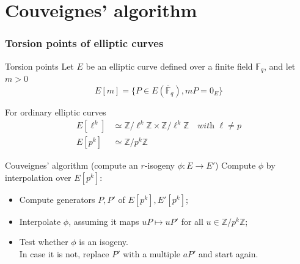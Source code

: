 \documentclass[10pt]{beamer}
\theoremstyle{plain}
\theoremstyle{definition}
\theoremstyle{definition}
\theoremstyle{definition}
\theoremstyle{definition}
\theoremstyle{remark}
\theoremstyle{remark}
\newcommand{\orangebox}[2]{\begin{block}{#1}#2\end{block}}
\renewcommand{\emph}[1]{{\usebeamercolor[fg]{structure}#1}}
\def\F{\mathbb{F}}
\begin{document}

\section{Couveignes' algorithm}

\begin{frame}
  \frametitle{Torsion points of elliptic curves}

  \vspace{-1mm}

  \orangebox{Torsion points}{
    Let $E$ be an elliptic curve defined over a finite field $\F_q$, and let $m>0$
    \vspace{-1.5mm}
    \[E[m]= \{ P \in E(\bar{\F}_q) , mP=0_E \} \]

    For \emph{ordinary} elliptic curves
    \vspace{-1.5mm}
    \begin{align*}
      E[\ell^k]&\simeq\mathbb{Z}/\ell^k\mathbb{Z} \times \mathbb{Z}/\ell^k\mathbb{Z} \quad \textit{with } \ell \neq p \\
      E[p^k]&\simeq\mathbb{Z}/p^k\mathbb{Z}
    \end{align*}
  }
  \pause
  \orangebox{Couveignes' algorithm (compute an $r$-isogeny $\phi:E\to E'$)}{
    Compute $\phi$ by interpolation over $E[p^k]$:
    \begin{itemize}
    \item Compute generators $P,P'$ of $E[p^k],E'[p^k]$;
    \item Interpolate $\phi$, assuming it maps $uP\mapsto uP'$ for all $u \in \mathbb{Z}/p^k\mathbb{Z}$;
    \item Test whether $\phi$ is an isogeny.\\
      In case it is not, replace $P'$ with a multiple $aP'$ and start again.
    \end{itemize}

  }
\end{frame}

\end{document}
